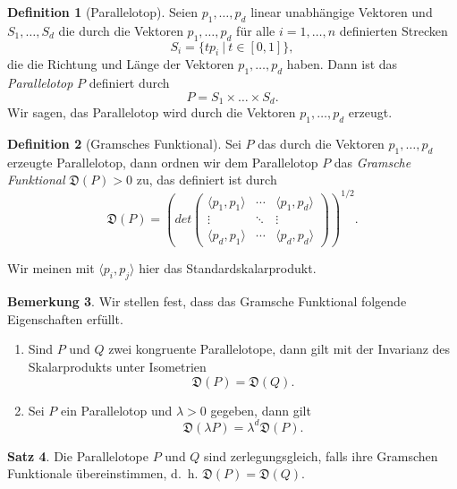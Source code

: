\documentclass[11pt,titlepage]{article}
\theoremstyle{definition}
\newtheorem{theorem}{Satz}[section]
\newtheorem{definition}[theorem]{Definition}
\newtheorem{remark}[theorem]{Bemerkung}
\theoremstyle{remark}
\begin{document}
	\begin{definition}[Parallelotop]
		Seien $p_1,\ldots,p_d$ linear unabhängige Vektoren und $S_1,\ldots,S_d$ 
		die durch die Vektoren $p_1,\ldots,p_d$ für alle $i=1,\ldots,n$ 
		definierten Strecken
		\[S_i=\{tp_i\ \vert\ t\in[0,1]\},\]
		die die Richtung und Länge der Vektoren $p_1,\ldots,p_d$ 
		haben. Dann ist das \textsl{Parallelotop} $P$ definiert durch 
		\[P=S_1\times\ldots\times S_d.\]
		Wir sagen, das Parallelotop wird durch die Vektoren $p_1,\ldots,p_d$ 
		erzeugt.
	\end{definition}
	
	\begin{definition}[Gramsches Funktional]
		Sei $P$ das durch die Vektoren $p_1,\ldots,p_d$ 
		erzeugte Parallelotop, dann ordnen wir dem Parallelotop $P$ das 
		\textsl{Gramsche Funktional} $\mathfrak{D}(P)>0$ zu, das definiert ist durch
		\[\mathfrak{D}(P)=\left(det \begin{pmatrix}
		\langle p_1,p_1\rangle & \cdots &\langle p_1,p_d\rangle \\
		\vdots & \ddots & \vdots \\
		\langle p_d,p_1 \rangle & \cdots & \langle p_d,p_d \rangle
		\end{pmatrix}\right)^{1/2}.\]
	\end{definition}
	
	Wir meinen mit $\langle p_i,p_j\rangle$ hier das Standardskalarprodukt. 
	
	\begin{remark} \label{bem:gramfunk}
		Wir stellen fest, dass das Gramsche Funktional folgende Eigenschaften 
		erfüllt.
		\begin{enumerate}
			\item Sind $P$ und $Q$ zwei kongruente Parallelotope, dann gilt mit 
			der Invarianz des Skalarprodukts unter Isometrien
			\[\mathfrak{D}(P)=\mathfrak{D}(Q).\]
			\item \label{bem:gramfunk;2} Sei $P$ ein Parallelotop und $\lambda>0$ gegeben, dann gilt 
			\[\mathfrak{D}(\lambda P)=\lambda^d \mathfrak{D}(P).\]
		\end{enumerate}
	\end{remark}
	
	\begin{theorem} \label{thm:zerlgram}
		Die Parallelotope $P$ und $Q$ sind zerlegungsgleich, falls ihre 
		Gramschen Funktionale übereinstimmen, d.~h. $\mathfrak{D}(P)=\mathfrak{D}(Q)$.
	\end{theorem}
	
\end{document}
